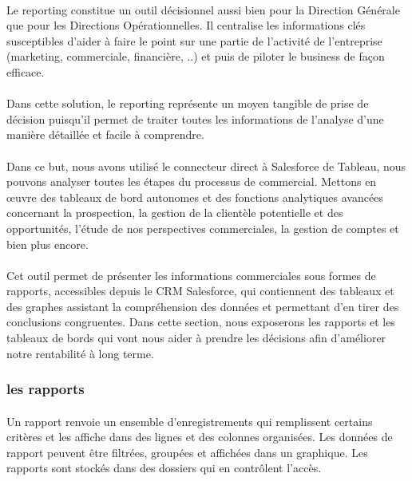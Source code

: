 \documentclass[a4paper, 12pt]{report}
\begin{document}
\begin{itemize}
\paragraph{}Le reporting constitue un outil décisionnel aussi bien pour la Direction Générale que pour les Directions Opérationnelles. Il centralise les informations clés susceptibles d'aider à faire le point sur une partie de l'activité de l'entreprise (marketing, commerciale, financière, ..) et puis de piloter le business de façon efficace. 
\paragraph{}
Dans cette solution, le reporting représente un moyen tangible de prise de décision puisqu'il permet de traiter toutes les informations de l'analyse d’une manière détaillée et facile à comprendre.
\paragraph{}
Dans ce but, nous avons utilisé le connecteur direct à Salesforce de Tableau, nous pouvons analyser toutes les étapes du processus de commercial. Mettons en œuvre des tableaux de bord autonomes et des fonctions analytiques avancées concernant la prospection, la gestion de la clientèle potentielle et des opportunités, l'étude de nos perspectives commerciales, la gestion de comptes et bien plus encore.
\paragraph{}
 Cet outil permet de présenter les informations commerciales sous formes de rapports, accessibles depuis le CRM Salesforce, qui contiennent des tableaux et des graphes assistant la compréhension des données et permettant d’en tirer des conclusions congruentes.
\paragrapg{}
Dans cette section, nous exposerons les rapports et les tableaux de bords qui vont nous aider à prendre les décisions afin d'améliorer notre rentabilité à long terme.
\subsubsection{les rapports}
\paragraph{}
Un rapport renvoie un ensemble d'enregistrements qui remplissent certains critères et les affiche dans des lignes et des colonnes organisées. Les données de rapport peuvent être filtrées, groupées et affichées dans un graphique. Les rapports sont stockés dans des dossiers qui en contrôlent l'accès. 



\end{itemize}
\end{document}
